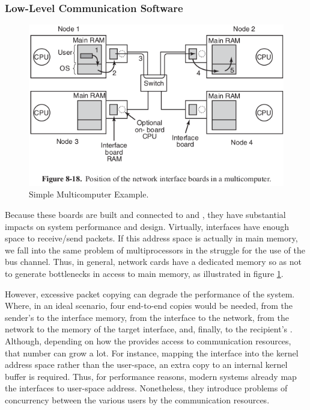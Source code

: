 			\subsubsection{Low-Level Communication Software}
			\label{sec.multicomputers-low-sw}

				\begin{figure}[h]
					\centering
					\includegraphics[width=.8\textwidth]{images/multicomputer.png}

					\caption{
						Simple Multicomputer Example.
					}\par
					\label{fig.multicomputer}
				\end{figure}

				Because these boards are built and connected to \cpus and \ram,
				they have substantial impacts on system performance and \os design.
				Virtually, interfaces have enough \ram space to receive/send packets.
				If this address space is actually in main memory, we fall into the same
				problem of multiprocessors in the struggle for the use of the bus channel.
				Thus, in general, network cards have a dedicated memory so as not to
				generate bottlenecks in access to main memory, as illustrated in figure \ref{fig.multicomputer}.

				However, excessive packet copying can degrade the performance of the system.
				Where, in an ideal scenario, four end-to-end copies would be needed,
				\ie from the sender's \ram to the interface memory, from the interface
				to the network, from the network to the memory of the target interface, and,
				finally, to the recipient's \ram.
				Although, depending on how the \os provides access to communication
				resources, that number can grow a lot.
				For instance, mapping the interface into the kernel address space
				rather than the user-space, an extra copy to an internal kernel
				buffer is required.
				Thus, for performance reasons, modern systems already map the interfaces
				to user-space address.
				Nonetheless, they introduce problems of concurrency between the various
				users by the communication resources.

